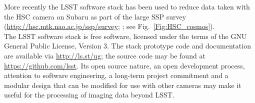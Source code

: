 More recently the LSST software stack has been used to reduce data taken with the HSC camera on
Subaru as part of the large SSP survey (\url{http://hsc.mtk.nao.ac.jp/ssp/survey};
\cite{2017arXiv170405858A,2017arXiv170506766B}; see Fig.~\ref{Fig:HSC_cosmos}).
\\

The LSST software stack is free software, licensed under the terms of the GNU General
Public License, Version 3. The stack
prototype code and documentation are available via \url{http://ls.st/ug};
the source code may be found at \url{https://github.com/lsst}.
Its open source nature, an open development
process, attention to software engineering, a long-term project
commitment and a modular design that can be modified for use with
other cameras
may make it useful for the processing of imaging data beyond LSST.


